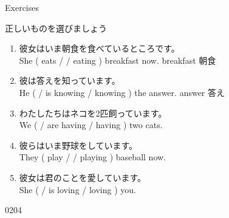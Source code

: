 \documentclass[aspectratio=169,xcolor={dvipsnames,table}]{beamer}
\newcommand{\myaudio}[1]{\href{#1}{\faVolumeUp}}
\begin{document}
\begin{frame}[plain]{Exercises}
 
正しいものを選びましょう

\begin{enumerate}
 \item 彼女はいま朝食を食べているところです。\\
She ( eats /  / eating ) breakfast now.%
\hfill{\scriptsize breakfast  朝食}
 \item 彼は答えを知っています。\\
He (  / is knowing / knowing ) the answer.%
\hfill{\scriptsize answer  答え}
 \item わたしたちはネコを2匹飼っています。\\
We (  / are having / having ) two cats.
 \item 彼らはいま野球をしています。\\
They ( play / / playing ) baseball now.
 \item 彼女は君のことを愛しています。\\
She (  / is loving / loving ) you.
\end{enumerate}


\hfill{\tiny 0204}\,{\scriptsize \myaudio{./audio/021_is_ing_intro_05.mp3}}
\end{frame}
\end{document}
